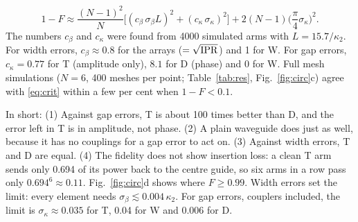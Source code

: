 \documentclass[journal,11pt]{IEEEtran}
\newcommand{\kc}{\kappa_2}
\begin{document}
\begin{equation}
1-F\approx\frac{(N-1)^2}{N}\Big[(c_\beta\,\sigma_\beta L)^2+(c_\kappa\,\sigma_\kappa)^2\Big]+2(N-1)\Big(\frac{\pi}{4}\sigma_\kappa\Big)^2 .
\label{eq:crit}
\end{equation}
The numbers $c_\beta$ and $c_\kappa$ were found from 4000 simulated arms with $L=15.7/\kc$. For width errors, $c_\beta\approx0.8$ for the arrays ($=\sqrt{\rm IPR}$) and 1 for W. For gap errors, $c_\kappa=0.77$ for T (amplitude only), $8.1$ for D (phase) and 0 for W. Full mesh simulations ($N=6$, 400 meshes per point; Table~\ref{tab:res}, Fig.~\ref{fig:circ}c) agree with \eqref{eq:crit} within a few per cent when $1-F<0.1$.

In short: (1) Against gap errors, T is about 100 times better than D, and the error left in T is in amplitude, not phase. (2) A plain waveguide does just as well, because it has no couplings for a gap error to act on. (3) Against width errors, T and D are equal. (4) The fidelity does not show insertion loss: a clean T arm sends only 0.694 of its power back to the centre guide, so six arms in a row pass only $0.694^6\approx0.11$. Fig.~\ref{fig:circ}d shows where $F\ge0.99$. Width errors set the limit: every element needs $\sigma_\beta\lesssim0.004\,\kc$. For gap errors, couplers included, the limit is $\sigma_\kappa\approx0.035$ for T, 0.04 for W and 0.006 for D.

\end{document}
